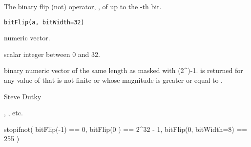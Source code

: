 \begin{Description}\relax
The binary flip (not) operator, ,  of  up to the -th bit.
\end{Description}
\begin{Usage}
\begin{verbatim}
bitFlip(a, bitWidth=32)
\end{verbatim}
\end{Usage}
\begin{Arguments}
\begin{ldescription}
\item[\code{a}] numeric vector.
\item[\code{bitWidth}] scalar integer between 0 and 32.
\end{ldescription}
\end{Arguments}
\begin{Value}
binary numeric vector of the same length as  masked with
(2\textasciicircum{})-1.   is returned for any value of
 that is not finite or whose magnitude is greater or equal to
.
\end{Value}
\begin{Author}\relax
Steve Dutky
\end{Author}
\begin{SeeAlso}\relax
{}, , etc.
\end{SeeAlso}
\begin{Examples}
\begin{ExampleCode}
 stopifnot(
  bitFlip(-1) == 0,
  bitFlip(0 ) == 2^32 - 1,
  bitFlip(0, bitWidth=8) == 255
 )
\end{ExampleCode}
\end{Examples}


